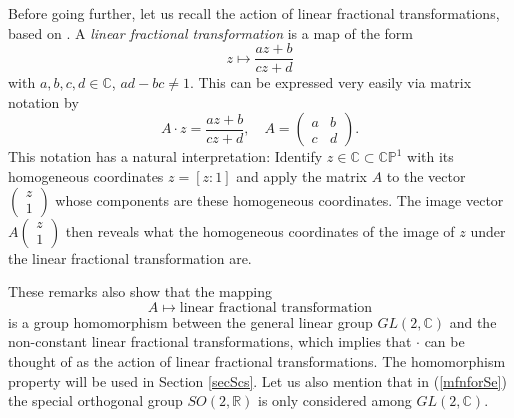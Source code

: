 \documentclass[preprint,12pt]{elsarticle}
\newcommand{\R}{{\mathbb R}}
\newcommand{\C}{{\mathbb C}}
\begin{document}
Before going further, let us recall the action of linear fractional transformations, based on \cite{Remweyl}. A \textit{linear fractional transformation} is a map of the form 
\begin{equation*}
z\mapsto \frac{az+b}{cz+d}
\end{equation*}
with $a,b,c,d\in\C$, $ad-bc\neq 1$. This can be expressed very easily via matrix notation by 
\[
A\cdot z=\frac{az+b}{cz+d}, \quad A=\begin{pmatrix} a&b \\ c&d \end{pmatrix}.
\]
This notation has a natural interpretation: Identify $z\in\C\subset \mathbb{CP}^1$ with its homogeneous coordinates $z=[z:1]$ and apply the matrix $A$ to the vector 
$(\begin{smallmatrix} z\\1 \end{smallmatrix})$ 
whose components are these homogeneous coordinates. The image vector 
$A(\begin{smallmatrix} z\\1 \end{smallmatrix})$ 
then reveals what the homogeneous coordinates of the image of $z$ under the linear fractional transformation are. 

These remarks also show that the mapping 
\[
A\mapsto \textrm{linear fractional transformation}
\]
is a group homomorphism between the general linear group $GL(2,\C)$ and the non-constant linear fractional transformations, which implies that $\cdot$ can be thought of as the action of linear fractional transformations. The homomorphism property will be used in Section \ref{secScs}. Let us also mention that in (\ref{mfnforSe}) the special orthogonal group $SO(2,\R)$ is only considered among $GL(2,\C)$.\\
\end{document}
